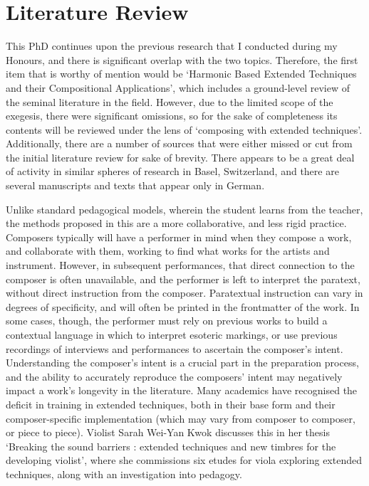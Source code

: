 \section{Literature Review}
This PhD continues upon the previous research that I conducted during my Honours, and there is significant overlap with the two topics.
Therefore, the first item that is worthy of mention would be `Harmonic Based Extended Techniques and their Compositional Applications', which includes a ground-level review of the seminal literature in the field.\autocite{grayHarmonicBasedExtended2019}
However, due to the limited scope of the exegesis, there were significant omissions, so for the sake of completeness its contents will be reviewed under the lens of `composing with extended techniques'.
Additionally, there are a number of sources that were either missed or cut from the initial literature review for sake of brevity.
There appears to be a great deal of activity in similar spheres of research in Basel, Switzerland, and there are several manuscripts and texts that appear only in German.

Unlike standard pedagogical models, wherein the student learns from the teacher, the methods proposed in this are a more collaborative, and less rigid practice.
Composers typically will have a performer in mind when they compose a work, and collaborate with them, working to find what works for the artists and instrument.
However, in subsequent performances, that direct connection to the composer is often unavailable, and the performer is left to interpret the paratext, without direct instruction from the composer.
Paratextual instruction can vary in degrees of specificity, and will often be printed in the frontmatter of the work.
In some cases, though, the performer must rely on previous works to build a contextual language in which to interpret esoteric markings, or use previous recordings of interviews and performances to ascertain the composer's intent.
Understanding the composer's intent is a crucial part in the preparation process, and the ability to accurately reproduce the composers' intent may negatively impact a work's longevity in the literature.
Many academics have recognised the deficit in training in extended techniques, both in their base form and their composer-specific implementation (which may vary from composer to composer, or piece to piece). Violist Sarah Wei-Yan Kwok discusses this in her thesis `Breaking the sound barriers : extended techniques and new timbres for the developing violist', where she commissions six etudes for viola exploring extended techniques, along with an investigation into pedagogy.\autocite{kwokBreakingSoundBarriers2018}

